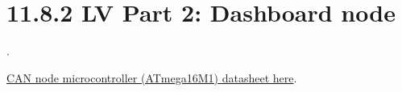 \documentclass{article}
\begin{document}
\section*{11.8.2 LV Part 2: Dashboard node}.

\href{http://www.atmel.com/images/8209s.pdf}{CAN node microcontroller (ATmega16M1) datasheet here}.

\end{document}
